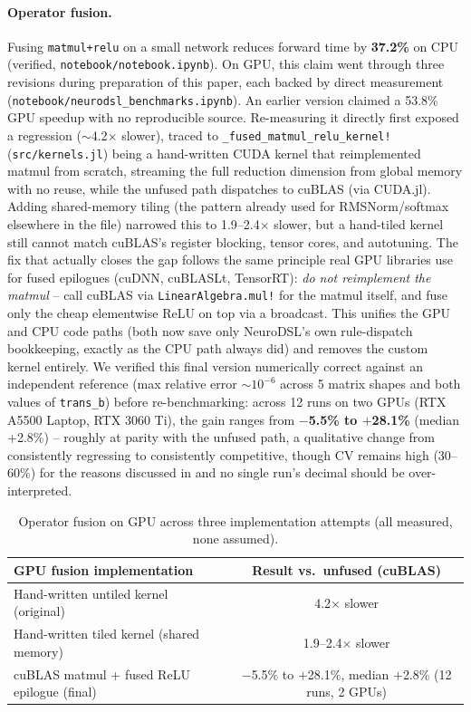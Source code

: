 \documentclass{article}
\begin{document}
\paragraph{Operator fusion.} Fusing \texttt{matmul+relu} on a small network reduces forward time by \textbf{37.2\%} on CPU (verified, \texttt{notebook/notebook.ipynb}). On GPU, this claim went through three revisions during preparation of this paper, each backed by direct measurement (\texttt{notebook/neurodsl\_benchmarks.ipynb}). An earlier version claimed a 53.8\% GPU speedup with no reproducible source. Re-measuring it directly first exposed a regression ($\sim$4.2$\times$ slower), traced to \texttt{\_fused\_matmul\_relu\_kernel!} (\texttt{src/kernels.jl}) being a hand-written CUDA kernel that reimplemented matmul from scratch, streaming the full reduction dimension from global memory with no reuse, while the unfused path dispatches to cuBLAS (via CUDA.jl). Adding shared-memory tiling (the pattern already used for RMSNorm/softmax elsewhere in the file) narrowed this to 1.9--2.4$\times$ slower, but a hand-tiled kernel still cannot match cuBLAS's register blocking, tensor cores, and autotuning. The fix that actually closes the gap follows the same principle real GPU libraries use for fused epilogues (cuDNN, cuBLASLt, TensorRT): \emph{do not reimplement the matmul} -- call cuBLAS via \texttt{LinearAlgebra.mul!} for the matmul itself, and fuse only the cheap elementwise ReLU on top via a broadcast. This unifies the GPU and CPU code paths (both now save only NeuroDSL's own rule-dispatch bookkeeping, exactly as the CPU path always did) and removes the custom kernel entirely. We verified this final version numerically correct against an independent reference (max relative error $\sim 10^{-6}$ across 5 matrix shapes and both values of \texttt{trans\_b}) before re-benchmarking: across 12 runs on two GPUs (RTX A5500 Laptop, RTX 3060 Ti), the gain ranges from \textbf{$-$5.5\% to $+$28.1\%} (median $+$2.8\%) -- roughly at parity with the unfused path, a qualitative change from consistently regressing to consistently competitive, though CV remains high (30--60\%) for the reasons discussed in  and no single run's decimal should be over-interpreted.

\begin{table}[H]
\centering
\caption{Operator fusion on GPU across three implementation attempts (all measured, none assumed).}
\label{tab:fusion_gpu_history}
\small
\begin{tabular}{l c}
\toprule
\textbf{GPU fusion implementation} & \textbf{Result vs.\ unfused (cuBLAS)} \\
\midrule
Hand-written untiled kernel (original) & 4.2$\times$ slower \\
Hand-written tiled kernel (shared memory) & 1.9--2.4$\times$ slower \\
cuBLAS matmul + fused ReLU epilogue (final) & $-$5.5\% to $+$28.1\%, median $+$2.8\% (12 runs, 2 GPUs) \\
\bottomrule
\end{tabular}
\end{table}
\end{document}
